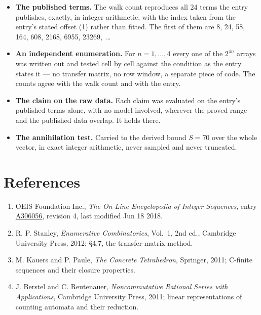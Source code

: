 \documentclass[11pt]{article}
\theoremstyle{definition}
\begin{document}
\begin{itemize}

\item {\bfseries The published terms.} The walk count reproduces all 24 terms the entry publishes, exactly, in integer arithmetic, with the index taken from the entry's stated offset (1) rather than fitted. The first of them are 8, 24, 58, 164, 608, 2168, 6955, 23269,~\dots

\item {\bfseries An independent enumeration.} For $n = 1,\dots,4$ every one of the $2^{4n}$ arrays was written out and tested cell by cell against the condition as the entry states it --- no transfer matrix, no row window, a separate piece of code. The counts agree with the walk count and with the entry.

\item {\bfseries The claim on the raw data.} Each claim was evaluated on the entry's published terms alone, with no model involved, wherever the proved range and the published data overlap. It holds there.

\item {\bfseries The annihilation test.} Carried to the derived bound $S = 70$ over the whole vector, in exact integer arithmetic, never sampled and never truncated.

\end{itemize}

\section{References}

\begin{enumerate}

\item OEIS Foundation Inc., \emph{The On-Line Encyclopedia of Integer Sequences}, entry \href{https://oeis.org/A306056}{A306056}, revision 4, last modified Jun 18 2018.

\item R. P. Stanley, \emph{Enumerative Combinatorics}, Vol.~1, 2nd ed., Cambridge University Press, 2012; \S4.7, the transfer-matrix method.

\item M. Kauers and P. Paule, \emph{The Concrete Tetrahedron}, Springer, 2011; C-finite sequences and their closure properties.

\item J. Berstel and C. Reutenauer, \emph{Noncommutative Rational Series with Applications}, Cambridge University Press, 2011; linear representations of counting automata and their reduction.

\end{enumerate}
\end{document}
